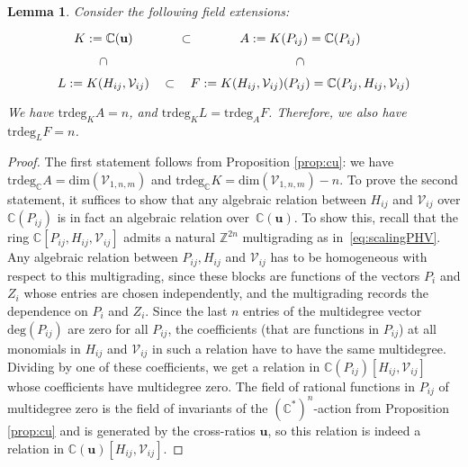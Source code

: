\documentclass[12pt,a4paper]{extarticle}
\newtheorem{lemma}[theorem]{Lemma}
\theoremstyle{definition}
\begin{document}
\begin{lemma} \label{lem:fieldext}
    Consider the following field extensions:
    \[
\begin{tikzcd}
K:=\mathbb{C}(\mathbf{u}) \arrow[r, phantom, "\subset"] 
  \arrow[d, phantom, "\rotatebox{270}{$\subset$}"'] 
&
A:=K(P_{ij}) =\mathbb{C}(P_{ij})\arrow[d, phantom, "\rotatebox{270}{$\subset$}"] \\
L:=K(H_{ij},\mathcal{V}_{ij}) \arrow[r, phantom, "\subset"] 
&
F:=K(H_{ij},\mathcal{V}_{ij})(P_{ij}) = \mathbb{C}(P_{ij},H_{ij},\mathcal{V}_{ij})
\end{tikzcd}
\]
We have $\mathrm{trdeg}_K A = n$, and $\mathrm{trdeg}_KL=\mathrm{trdeg}_A F$. 
Therefore, we also have $\mathrm{trdeg}_LF=n$.
\end{lemma}
\begin{proof}
The first statement follows from Proposition \ref{prop:cu}: we have $\mathrm{trdeg}_\mathbb{C}A=\mathrm{dim}(\mathcal{V}_{1,n,m})$ and $\mathrm{trdeg}_\mathbb{C} K = \mathrm{dim}(\mathcal{V}_{1,n,m}) - n$.
To prove the second statement, it suffices to show that any algebraic relation between $H_{ij}$ and $\mathcal{V}_{ij}$ over $\mathbb{C}(P_{ij})$ is in fact an algebraic relation over~$\mathbb{C}(\mathbf{u})$. 
To show this, recall that the ring $\mathbb{C}[P_{ij}, H_{ij},\mathcal{V}_{ij}]$ admits a natural $\mathbb{Z}^{2n}$ multigrading as in~\eqref{eq:scalingPHV}. 
Any algebraic relation between $P_{ij}, H_{ij}$ and $\mathcal{V}_{ij}$ has to be homogeneous with respect to this multigrading, since these blocks are functions of the vectors $P_i$ and $Z_i$ whose entries are chosen independently, and the multigrading records the dependence on $P_i$ and $Z_i$. 
Since the last $n$ entries of the multidegree vector $\mathrm{deg}(P_{ij})$ are zero for all $P_{ij}$, the coefficients (that are functions in $P_{ij}$) at all monomials in $H_{ij}$ and $\mathcal{V}_{ij}$ in such a relation have to have the same multidegree.
Dividing by one of these coefficients, we get a relation in $\mathbb{C}(P_{ij})[H_{ij}, \mathcal{V}_{ij}]$ whose coefficients have multidegree zero. 
The field of rational functions in $P_{ij}$ of multidegree zero is the field of invariants of the $(\mathbb{C}^*)^n$-action from Proposition \ref{prop:cu} and is generated by the cross-ratios $\mathbf{u}$, so this relation is indeed a relation in $\mathbb{C}(\mathbf{u})[H_{ij},\mathcal{V}_{ij}]$.
\end{proof}
\end{document}
